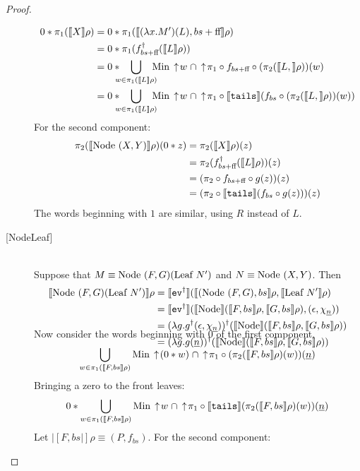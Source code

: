 \begin{proof}
\begin{description}
\begin{align*}
0*\pi_1(|[X|]\rho) &= 0*\pi_1(|[(\lambda x.M')(L), bs+\false\!\!|]\rho) \\
&= 0*\pi_1(f_{bs+\false\!\!}^{\dagger}
(|[L|]\rho)) \\
&= 0*\!\!\!\!\bigcup_{w\in \pi_1(|[L|]\rho)} \!\!\!\!\Min \ua w \;\cap 
\ua \pi_1\circ f_{bs+\false\!\!} \circ (\pi_2(|[L,|]\rho))(w) \\
&= 0*\!\!\!\!\bigcup_{w\in \pi_1(|[L|]\rho)} \!\!\!\!\Min \ua w \;\cap 
\ua \pi_1\circ |[\texttt{tails}|](f_{bs} \circ (\pi_2(|[L,|]\rho))(w))
\end{align*}
For the second component: \vspace{-3 mm}
\begin{align*}
\pi_2 (|[\textrm{Node }(X,Y)|]\rho) (0*z) &=
\pi_2 (|[X|]\rho) (z) \\
&= \pi_2 (f_{bs+\textrm{ff }\!\!}^{\dagger}(|[L|]\rho))(z) \\ 
&= (\pi_2\circ f_{bs+\textrm{ff }\!\!}\circ g(z))(z) \\
&= (\pi_2\circ |[\texttt{tails}|](f_{bs}\circ g(z)))(z) 
\end{align*}
The words beginning with $1$ are similar, using $R$ instead of $L$.
\item[{[}NodeLeaf{]}] \hfill \\ 
Suppose that $M\equiv \textrm{Node }(F,G)(\textrm{Leaf } N')$ and $N\equiv \textrm{Node }(X,Y)$.  Then \vspace{-3 mm}
\begin{align*}
|[\textrm{Node }(F,G)(\textrm{Leaf } N')|]\rho &= 
|[\texttt{ev}^\dagger|](|[(\textrm{Node }(F,G), bs|]\rho, 
|[\textrm{Leaf } N'|]\rho) \\
&= |[\texttt{ev}^\dagger|](|[\textrm{Node }\!\!|](|[F,bs|]\rho, |[G,bs|]\rho),
(\epsilon, \chi_{\underline{n}})) \\
&= (\lambda g.g^{\dagger}(\epsilon, \chi_{\underline{n}}))^{\dagger}
(|[\textrm{Node }\!\!|](|[F,bs|]\rho, |[G,bs|]\rho)) \\
&= (\lambda g.g(\underline{n}))^{\dagger}
(|[\textrm{Node }\!\!|](|[F,bs|]\rho, |[G,bs|]\rho))\\[-10 mm]
\end{align*}
Now consider the words beginning with $0$ of the first component.
\begin{displaymath}
\bigcup_{w\in \pi_1(|[F,bs|]\rho)} \textrm{Min} \,\uparrow\! (0*w) \;\cap 
\,\uparrow\! \pi_1\circ (\pi_2(|[F,bs|]\rho)(w))(\underline{n})
\end{displaymath}
Bringing a zero to the front leaves:
\begin{displaymath}
0 * \bigcup_{w\in \pi_1(|[F,bs|]\rho)} \textrm{Min} \,\uparrow\! w \;\cap 
\,\uparrow\! \pi_1\circ |[\texttt{tails}|](\pi_2(|[F,bs|]\rho)(w))(\underline{n})
\end{displaymath}
Let $|[F,bs|]\rho \equiv (P,f_{bs})$.  For the second component:


\end{description}
\end{proof}
